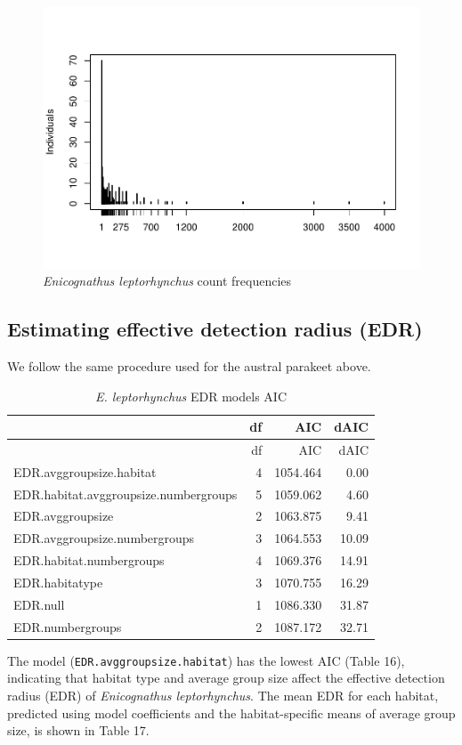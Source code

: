 \documentclass[]{article}
\begin{document}
\begin{figure}[H]
\includegraphics{Patagonia_parrots_density_analysis_files/figure-latex/unnamed-chunk-18-1} \caption{\textit{Enicognathus leptorhynchus} count frequencies}\label{fig:unnamed-chunk-18}
\end{figure}

\subsection{Estimating effective detection radius
(EDR)}\label{estimating-effective-detection-radius-edr-1}

We follow the same procedure used for the austral parakeet above.

\begin{longtable}[]{@{}lrrr@{}}
\caption{\textit{E. leptorhynchus} EDR models AIC}\tabularnewline
\toprule
& df & AIC & dAIC\tabularnewline
\midrule
\endfirsthead
\toprule
& df & AIC & dAIC\tabularnewline
\midrule
\endhead
EDR.avggroupsize.habitat & 4 & 1054.464 & 0.00\tabularnewline
EDR.habitat.avggroupsize.numbergroups & 5 & 1059.062 &
4.60\tabularnewline
EDR.avggroupsize & 2 & 1063.875 & 9.41\tabularnewline
EDR.avggroupsize.numbergroups & 3 & 1064.553 & 10.09\tabularnewline
EDR.habitat.numbergroups & 4 & 1069.376 & 14.91\tabularnewline
EDR.habitatype & 3 & 1070.755 & 16.29\tabularnewline
EDR.null & 1 & 1086.330 & 31.87\tabularnewline
EDR.numbergroups & 2 & 1087.172 & 32.71\tabularnewline
\bottomrule
\end{longtable}

The model (\texttt{EDR.avggroupsize.habitat}) has the lowest AIC (Table
16), indicating that habitat type and average group size affect the
effective detection radius (EDR) of \emph{Enicognathus leptorhynchus}.
The mean EDR for each habitat, predicted using model coefficients and
the habitat-specific means of average group size, is shown in Table 17.
\end{document}
